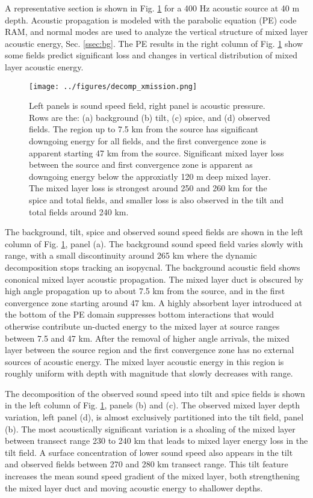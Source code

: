 \documentclass[preprint,NumberedRefs]{JASA}
\begin{document}
A representative section is shown in Fig. \ref{fig:decomp_x} for a 400 Hz acoustic source at 40 m depth. Acoustic propagation is modeled with the parabolic equation (PE) code RAM, and normal modes are used to analyze the vertical structure of mixed layer acoustic energy, Sec. \ref{ssec:bg}. The PE results in the right column of Fig. \ref{fig:decomp_x} show some fields predict significant loss and changes in vertical distribution of mixed layer acoustic energy.

\begin{figure}
\texttt{[image: ../figures/decomp\_xmission.png]}
    \caption{\label{fig:decomp_x}{Left panels is sound speed field, right panel is acoustic pressure. Rows are the: (a) background (b) tilt, (c) spice, and (d) observed fields. The region up to 7.5 km from the source has significant downgoing energy for all fields, and the first convergence zone is apparent starting 47 km from the source. Significant mixed layer loss between the source and first convergence zone is apparent as downgoing energy below the approxiatly 120 m deep mixed layer. The mixed layer loss is strongest around 250 and 260 km for the spice and total fields, and smaller loss is also observed in the tilt and total fields around 240 km.}}
\end{figure}

The background, tilt, spice and observed sound speed fields are shown in the left column of Fig. \ref{fig:decomp_x}, panel (a). The background sound speed field varies slowly with range, with a small discontinuity around 265 km where the dynamic decomposition stops tracking an isopycnal. The background acoustic field shows cononical mixed layer acoustic propagation. The mixed layer duct is obscured by high angle propagation up to about 7.5 km from the source, and in the first convergence zone starting around 47 km. A highly absorbent layer introduced at the bottom of the PE domain suppresses bottom interactions that would otherwise contribute un-ducted energy to the mixed layer at source ranges between 7.5 and 47 km. After the removal of higher angle arrivals, the mixed layer between the source region and the first convergence zone has no external sources of acoustic energy. The mixed layer acoustic energy in this region is roughly uniform with depth with magnitude that slowly decreases with range.

The decomposition of the observed sound speed into tilt and spice fields is shown in the left column of Fig. \ref{fig:decomp_x}, panels (b) and (c). The observed mixed layer depth variation, left panel (d), is almost exclusively partitioned into the tilt field, panel (b). The most acoustically significant variation is a shoaling of the mixed layer between transect range 230 to 240 km that leads to mixed layer energy loss in the tilt field. A surface concentration of lower sound speed also appears in the tilt and observed fields between 270 and 280 km transect range. This tilt feature increases the mean sound speed gradient of the mixed layer, both strengthening the mixed layer duct and moving acoustic energy to shallower depths.
\end{document}
